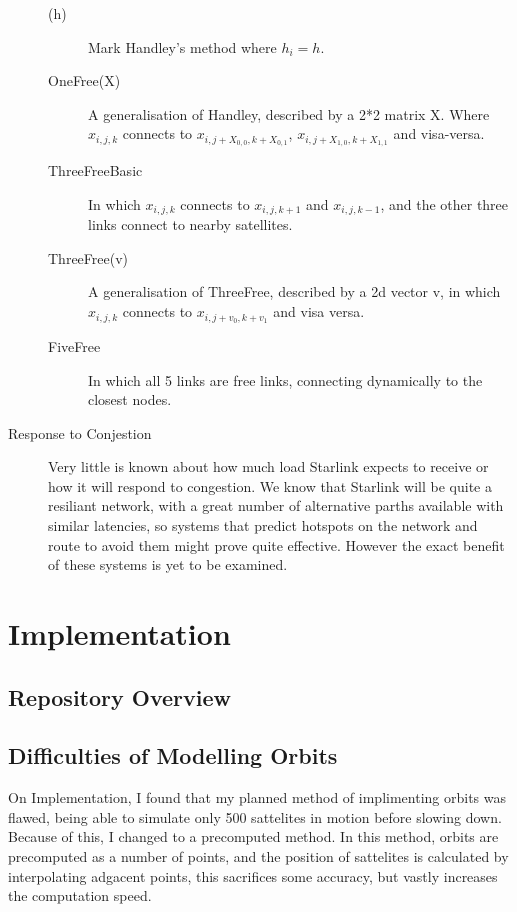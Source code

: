 \documentclass[12pt]{article}
\begin{document}
\begin{description}
\begin{description}
\item[(h)] Mark Handley's method where $h_i = h$.
\item[OneFree(X)] A generalisation of Handley, described by a 2*2 matrix X. Where $x_{i,j,k}$ connects to $x_{i,j+X_{0,0},k+X_{0,1}}$, $x_{i,j+X_{1,0},k+X_{1,1}}$ and visa-versa.
\item[ThreeFreeBasic] In which $x_{i,j,k}$ connects to $x_{i,j,k+1}$ and $x_{i,j,k-1}$, and the other three links connect to nearby satellites.
\item[ThreeFree(v)] A generalisation of ThreeFree, described by a 2d vector v, in which $x_{i,j,k}$ connects to $x_{i,j+v_0,k+v_1}$ and visa versa.
\item[FiveFree] In which all 5 links are free links, connecting dynamically to the closest nodes.
\end{description}

\item[Response to Conjestion]
Very little is known about how much load Starlink expects to receive or how it will respond to congestion. We know that Starlink will be quite a resiliant network, with a great number of alternative parths available with similar latencies, so systems that predict hotspots on the network and route to avoid them might prove quite effective. However the exact benefit of these systems is yet to be examined.
\end{description}

\section{Implementation}

\subsection{Repository Overview}

\subsection{Difficulties of Modelling Orbits}
On Implementation, I found that my planned method of implimenting orbits was flawed, being able to simulate only 500 sattelites in motion before slowing down. Because of this, I changed to a precomputed method. In this method, orbits are precomputed as a number of points, and the position of sattelites is calculated by interpolating adgacent points, this sacrifices some accuracy, but vastly increases the computation speed.
\end{document}
